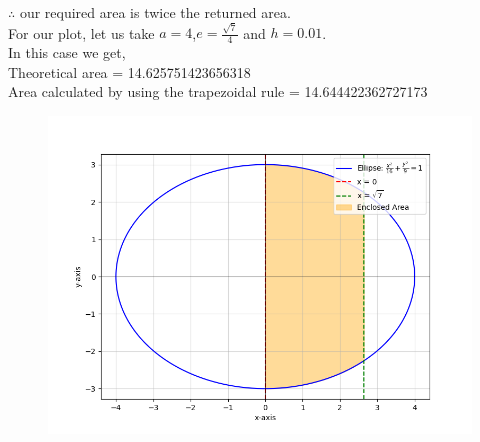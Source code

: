 \documentclass[journal]{IEEEtran}
\begin{document}
$\therefore$ our required area is twice the returned area.\\
For our plot, let us take $a = 4$,$e = \frac{\sqrt{7}}{4}$ and $h = 0.01$.\\
In this case we get, \\
Theoretical area = 14.625751423656318\\
Area calculated by using the trapezoidal rule = 14.644422362727173
\begin{figure}[h!]
   \centering
   \includegraphics[width=0.75\columnwidth]{figures/Figure_1.png}
\end{figure}
\end{document}
